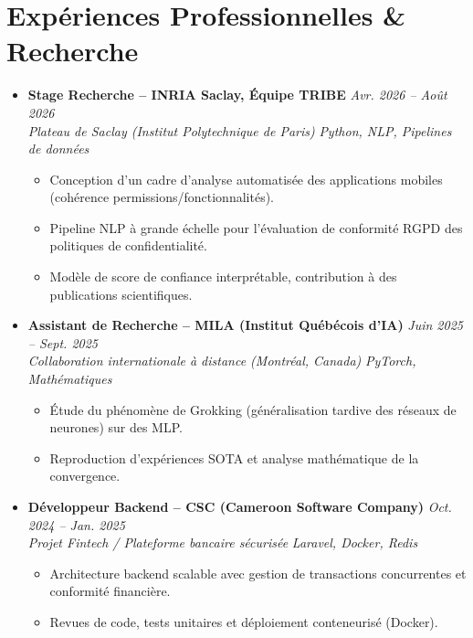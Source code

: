\documentclass[a4paper,11pt]{article}
\begin{document}
\section{Expériences Professionnelles \& Recherche}
\begin{itemize}[leftmargin=*, label={-}]

\item \textbf{Stage Recherche -- INRIA Saclay, Équipe TRIBE} \hfill \textit{Avr. 2026 -- Août 2026} \\
\textit{Plateau de Saclay (Institut Polytechnique de Paris)} \hfill \textit{Python, NLP, Pipelines de données}
\vspace{-2pt}
    \begin{itemize}[leftmargin=0.4cm, nosep, label=\tiny$\bullet$]
        \item \small{Conception d'un cadre d'analyse automatisée des applications mobiles (cohérence permissions/fonctionnalités).}
        \item \small{Pipeline NLP à grande échelle pour l'évaluation de conformité RGPD des politiques de confidentialité.}
        \item \small{Modèle de score de confiance interprétable, contribution à des publications scientifiques.}
    \end{itemize}
\vspace{3pt}

\item \textbf{Assistant de Recherche -- MILA (Institut Québécois d'IA)} \hfill \textit{Juin 2025 -- Sept. 2025} \\
\textit{Collaboration internationale à distance (Montréal, Canada)} \hfill \textit{PyTorch, Mathématiques}
\vspace{-2pt}
    \begin{itemize}[leftmargin=0.4cm, nosep, label=\tiny$\bullet$]
        \item \small{Étude du phénomène de Grokking (généralisation tardive des réseaux de neurones) sur des MLP.}
        \item \small{Reproduction d'expériences SOTA et analyse mathématique de la convergence.}
    \end{itemize}
\vspace{3pt}

\item \textbf{Développeur Backend -- CSC (Cameroon Software Company)} \hfill \textit{Oct. 2024 -- Jan. 2025} \\
\textit{Projet Fintech / Plateforme bancaire sécurisée} \hfill \textit{Laravel, Docker, Redis}
\vspace{-2pt}
    \begin{itemize}[leftmargin=0.4cm, nosep, label=\tiny$\bullet$]
        \item \small{Architecture backend scalable avec gestion de transactions concurrentes et conformité financière.}
        \item \small{Revues de code, tests unitaires et déploiement conteneurisé (Docker).}
    \end{itemize}
\vspace{3pt}

\end{itemize}
\end{document}
